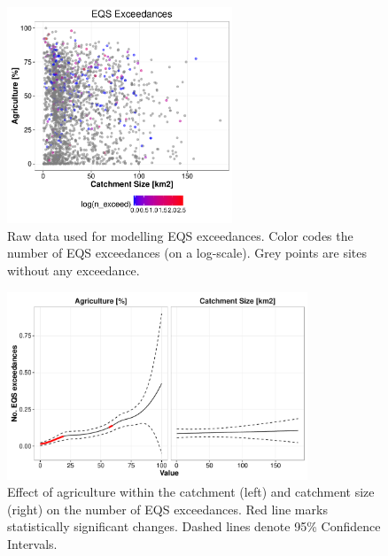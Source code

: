 \documentclass[pdftex,a4paper]{scrreprt}
\begin{document}
\begin{figure}[h]
	\centering
	\includegraphics[width = 0.6\textwidth]{ezgagrieqs}
	\caption{Raw data used for modelling EQS exceedances. Color codes the number of EQS exceedances (on a log-scale). Grey points are sites without any exceedance.}
	\label{fig:ezgagrieqs}
\end{figure}

\begin{figure}
  \includegraphics[width=0.8\textwidth]{ezgagrieqsmodel}
  \caption{Effect of agriculture within the catchment (left) and catchment size (right) on the number of EQS exceedances. Red line marks statistically significant changes. Dashed lines denote 95\% Confidence Intervals.
  }
  \label{fig:ezgeqsagrimodel}
\end{figure}




\end{document}
